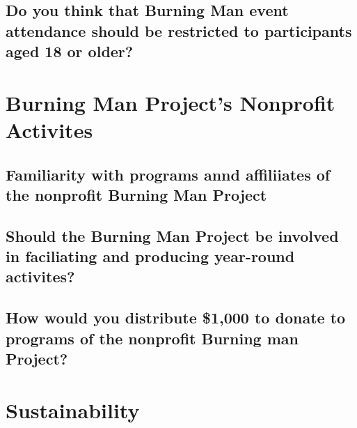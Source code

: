\documentclass[
]{book}
\begin{document}
\hypertarget{do-you-think-that-burning-man-event-attendance-should-be-restricted-to-participants-aged-18-or-older}{%
\subsection{Do you think that Burning Man event attendance should be restricted to participants aged 18 or older?}\label{do-you-think-that-burning-man-event-attendance-should-be-restricted-to-participants-aged-18-or-older}}

\hypertarget{burning-man-projects-nonprofit-activites}{%
\section{Burning Man Project's Nonprofit Activites}\label{burning-man-projects-nonprofit-activites}}

\hypertarget{familiarity-with-programs-annd-affiliiates-of-the-nonprofit-burning-man-project}{%
\subsection{Familiarity with programs annd affiliiates of the nonprofit Burning Man Project}\label{familiarity-with-programs-annd-affiliiates-of-the-nonprofit-burning-man-project}}

\hypertarget{should-the-burning-man-project-be-involved-in-faciliating-and-producing-year-round-activites}{%
\subsection{Should the Burning Man Project be involved in faciliating and producing year-round activites?}\label{should-the-burning-man-project-be-involved-in-faciliating-and-producing-year-round-activites}}

\hypertarget{how-would-you-distribute-1000-to-donate-to-programs-of-the-nonprofit-burning-man-project}{%
\subsection{How would you distribute \$1,000 to donate to programs of the nonprofit Burning man Project?}\label{how-would-you-distribute-1000-to-donate-to-programs-of-the-nonprofit-burning-man-project}}

\hypertarget{sustainability}{%
\section{Sustainability}\label{sustainability}}
\end{document}
